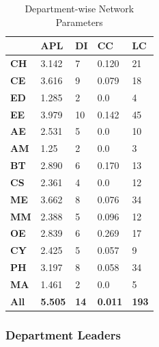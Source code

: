 \documentclass[conference,compsoc]{IEEEtran}
\begin{document}
\begin{table}[h]
\centering
\caption{Department-wise Network Parameters}
\label{tab:net_attri}
\begin{tabular}{|l|l|l|l|l|}
\hline
            & \textbf{APL} & \textbf{DI} & \textbf{CC} & \textbf{LC} \\ \hline
\textbf{CH} & 3.142        & 7           & 0.120       & 21          \\ \hline
\textbf{CE} & 3.616        & 9           & 0.079       & 18          \\ \hline
\textbf{ED} & 1.285        & 2           & 0.0         & 4           \\ \hline
\textbf{EE} & 3.979        & 10          & 0.142       & 45          \\ \hline
\textbf{AE} & 2.531        & 5           & 0.0         & 10          \\ \hline
\textbf{AM} & 1.25         & 2           & 0.0         & 3           \\ \hline
\textbf{BT} & 2.890        & 6           & 0.170       & 13          \\ \hline
\textbf{CS} & 2.361        & 4           & 0.0         & 12          \\ \hline
\textbf{ME} & 3.662        & 8           & 0.076       & 34          \\ \hline
\textbf{MM} & 2.388        & 5           & 0.096       & 12          \\ \hline
\textbf{OE} & 2.839        & 6           & 0.269       & 17          \\ \hline
\textbf{CY} & 2.425        & 5           & 0.057       & 9           \\ \hline
\textbf{PH} & 3.197        & 8           & 0.058       & 34          \\ \hline
\textbf{MA} & 1.461        & 2           & 0.0         & 5           \\ \hline
\textbf{All} & \textbf{5.505}        & \textbf{14}           & \textbf{0.011}         & \textbf{193}           \\ \hline
\end{tabular}
\end{table}

\subsubsection*{Department Leaders}
\end{document}
